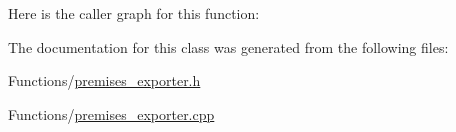 Here is the caller graph for this function\+:




The documentation for this class was generated from the following files\+:\begin{DoxyCompactItemize}
\item 
Functions/\hyperlink{premises__exporter_8h}{premises\+\_\+exporter.\+h}\item 
Functions/\hyperlink{premises__exporter_8cpp}{premises\+\_\+exporter.\+cpp}\end{DoxyCompactItemize}
